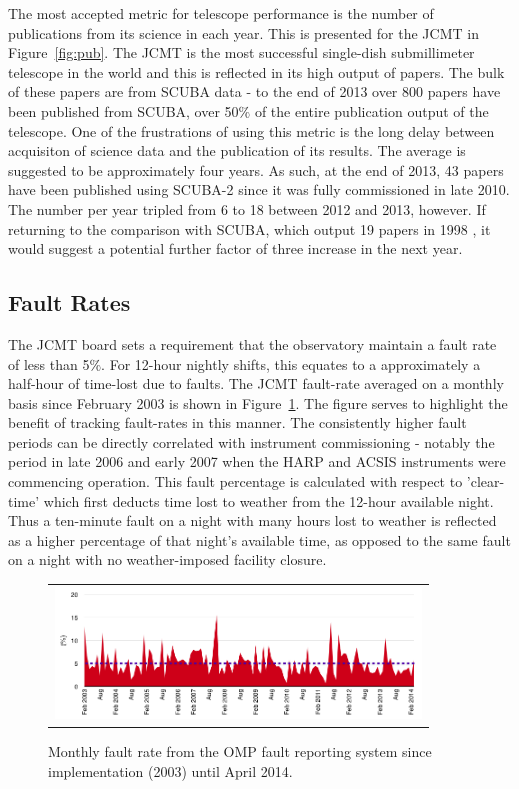 \documentclass[]{spie}  %
\begin{document}
The most accepted metric for telescope performance is the number of
publications from its science in each year. This is presented for the
JCMT in Figure~\ref{fig:pub}. The JCMT is the most successful
single-dish submillimeter telescope in the world and this is reflected
in its high output of papers. The bulk of these papers are from SCUBA
data - to the end of 2013 over 800 papers have been published from
SCUBA, over 50$\%$ of the entire publication output of the
telescope. One of the frustrations of using this metric is the long
delay between acquisiton of science data and the publication of its
results. The average is suggested to be approximately four years. As
such, at the end of 2013, 43 papers have been published using SCUBA-2
since it was fully commissioned in late 2010. The number per year
tripled from 6 to 18 between 2012 and 2013, however. If returning to
the comparison with SCUBA, which output 19 papers in 1998 , it would
suggest a potential further factor of three increase in the next year.


\subsection{Fault Rates}\label{sec:rates}

The JCMT board sets a requirement that the observatory maintain a
fault rate of less than 5$\%$. For 12-hour nightly shifts, this
equates to a approximately a half-hour of time-lost due to faults. The
JCMT fault-rate averaged on a monthly basis since February 2003 is
shown in Figure~\ref{fig:fault}. The figure serves to highlight the
benefit of tracking fault-rates in this manner. The consistently
higher fault periods can be directly correlated with instrument
commissioning - notably the period in late 2006 and early 2007 when
the HARP and ACSIS instruments were commencing operation. This fault
percentage is calculated with respect to 'clear-time' which first
deducts time lost to weather from the 12-hour available night. Thus a
ten-minute fault on a night with many hours lost to weather is
reflected as a higher percentage of that night's available time, as
opposed to the same fault on a night with no weather-imposed facility
closure.

 \begin{figure}
   \begin{center}
   \begin{tabular}{c}
   \includegraphics[height=3.5cm]{Faultrate2003_2014.png}
   \end{tabular}
   \end{center}
   \caption{\label{fig:fault}Monthly fault rate from the OMP fault reporting system since implementation (2003) until April 2014.}
\end{figure}
\end{document}
